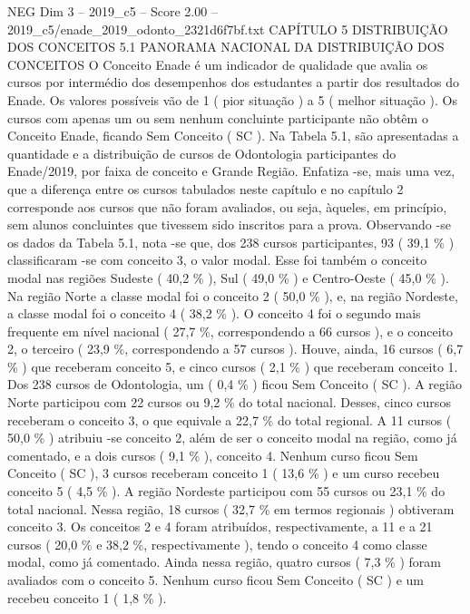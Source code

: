 \begin{textsample}{NEG Dim 3 – 2019\_c5 – Score 2.00 – 2019\_c5/enade\_2019\_odonto\_2321d6f7bf.txt}  \label{ex:f3_neg_187}
CAPÍTULO 5 DISTRIBUIÇÃO DOS CONCEITOS 5.1 PANORAMA NACIONAL DA DISTRIBUIÇÃO DOS CONCEITOS O Conceito Enade é um indicador de qualidade que avalia os cursos por intermédio dos desempenhos dos estudantes a partir dos resultados do Enade.
Os valores possíveis vão de 1 ( pior situação ) a 5 ( melhor situação ).
Os cursos com apenas um ou sem nenhum concluinte participante não obtêm o Conceito Enade, ficando Sem Conceito ( SC ).
Na Tabela 5.1, são apresentadas a quantidade e a distribuição de cursos de Odontologia participantes do Enade/2019, por faixa de conceito e Grande Região.
Enfatiza -se, mais uma vez, que a diferença entre os cursos tabulados neste capítulo e no capítulo 2 corresponde aos cursos que não foram avaliados, ou seja, àqueles, em princípio, sem alunos concluintes que tivessem sido inscritos para a prova.
Observando -se os dados da Tabela 5.1, nota -se que, dos 238 cursos participantes, 93 ( 39,1 \% ) classificaram -se com conceito 3, o valor modal.
Esse foi também o conceito modal nas regiões Sudeste ( 40,2 \% ), Sul ( 49,0 \% ) e Centro-Oeste ( 45,0 \% ).
Na região Norte a classe modal foi o conceito 2 ( 50,0 \% ), e, na região Nordeste, a classe modal foi o conceito 4 ( 38,2 \% ).
O conceito 4 foi o segundo mais frequente em nível nacional ( 27,7 \%, correspondendo a 66 cursos ), e o conceito 2, o terceiro ( 23,9 \%, correspondendo a 57 cursos ).
Houve, ainda, 16 cursos ( 6,7 \% ) que receberam conceito 5, e cinco cursos ( 2,1 \% ) que receberam conceito 1.
Dos 238 cursos de Odontologia, um ( 0,4 \% ) ficou Sem Conceito ( SC ).
A região Norte participou com 22 cursos ou 9,2 \% do total nacional.
Desses, cinco cursos receberam o conceito 3, o que equivale a 22,7 \% do total regional.
A 11 cursos ( 50,0 \% ) atribuiu -se conceito 2, além de ser o conceito modal na região, como já comentado, e a dois cursos ( 9,1 \% ), conceito 4.
Nenhum curso ficou Sem Conceito ( SC ), 3 cursos receberam conceito 1 ( 13,6 \% ) e um curso recebeu conceito 5 ( 4,5 \% ).
A região Nordeste participou com 55 cursos ou 23,1 \% do total nacional.
Nessa região, 18 cursos ( 32,7 \% em termos regionais ) obtiveram conceito 3.
Os conceitos 2 e 4 foram atribuídos, respectivamente, a 11 e a 21 cursos ( 20,0 \% e 38,2 \%, respectivamente ), tendo o conceito 4 como classe modal, como já comentado.
Ainda nessa região, quatro cursos ( 7,3 \% ) foram avaliados com o conceito 5.
Nenhum curso ficou Sem Conceito ( SC ) e um recebeu conceito 1 ( 1,8 \% ).

\end{textsample}

